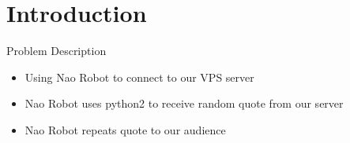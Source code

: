 \section{Introduction}
    
    \frame{\sectionpage}
    
    \begin{frame}{Problem Description}
		\begin{itemize}
			\item Using Nao Robot to connect to our VPS server
			\pause
			\item Nao Robot uses python2 to receive random quote from our server
			\pause
			\item Nao Robot repeats quote to our audience
		\end{itemize}
	\end{frame}